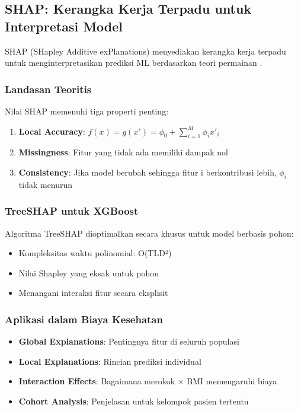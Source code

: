 \subsection{SHAP: Kerangka Kerja Terpadu untuk Interpretasi Model}
SHAP (SHapley Additive exPlanations) menyediakan kerangka kerja terpadu untuk menginterpretasikan prediksi ML berdasarkan teori permainan \citep{Lundberg2017}.

\subsubsection{Landasan Teoritis}
Nilai SHAP memenuhi tiga properti penting:
\begin{enumerate}
    \item \textbf{Local Accuracy}: $f(x) = g(x') = \phi_0 + \sum_{i=1}^{M} \phi_i x'_i$
    \item \textbf{Missingness}: Fitur yang tidak ada memiliki dampak nol
    \item \textbf{Consistency}: Jika model berubah sehingga fitur i berkontribusi lebih, $\phi_i$ tidak menurun
\end{enumerate}

\subsubsection{TreeSHAP untuk XGBoost}
Algoritma TreeSHAP dioptimalkan secara khusus untuk model berbasis pohon:
\begin{itemize}
    \item Kompleksitas waktu polinomial: O(TLD²)
    \item Nilai Shapley yang eksak untuk pohon
    \item Menangani interaksi fitur secara eksplisit
\end{itemize}

\subsubsection{Aplikasi dalam Biaya Kesehatan}
\begin{itemize}
    \item \textbf{Global Explanations}: Pentingnya fitur di seluruh populasi
    \item \textbf{Local Explanations}: Rincian prediksi individual
    \item \textbf{Interaction Effects}: Bagaimana merokok × BMI memengaruhi biaya
    \item \textbf{Cohort Analysis}: Penjelasan untuk kelompok pasien tertentu
\end{itemize}


